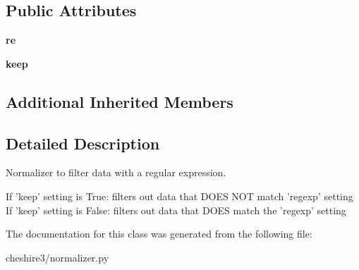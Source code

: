 \subsection*{Public Attributes}
\begin{DoxyCompactItemize}
\item 
\hypertarget{classcheshire3_1_1normalizer_1_1_regexp_filter_normalizer_adffeb75c956a716534ad0e4b844ea504}{{\bfseries re}}\label{classcheshire3_1_1normalizer_1_1_regexp_filter_normalizer_adffeb75c956a716534ad0e4b844ea504}

\item 
\hypertarget{classcheshire3_1_1normalizer_1_1_regexp_filter_normalizer_a77acaab0043eebd7955770a005a8cb12}{{\bfseries keep}}\label{classcheshire3_1_1normalizer_1_1_regexp_filter_normalizer_a77acaab0043eebd7955770a005a8cb12}

\end{DoxyCompactItemize}
\subsection*{Additional Inherited Members}


\subsection{Detailed Description}
\begin{DoxyVerb}Normalizer to filter data with a regular expression.

If 'keep' setting is True:
    filters out data that DOES NOT match 'regexp' setting
If 'keep' setting is False:
    filters out data that DOES match the 'regexp' setting
\end{DoxyVerb}
 

The documentation for this class was generated from the following file\-:\begin{DoxyCompactItemize}
\item 
cheshire3/normalizer.\-py\end{DoxyCompactItemize}
